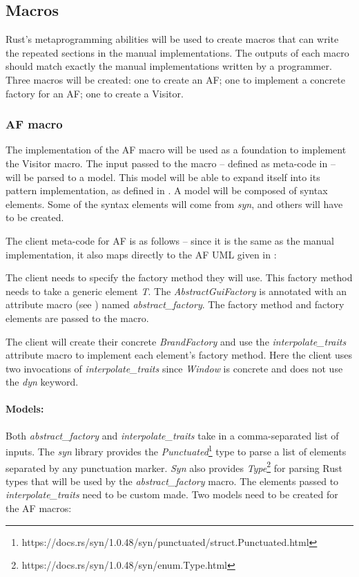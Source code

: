
\subsection{Macros}
Rust's metaprogramming abilities will be used to create macros that can write the repeated sections in the manual implementations.
The outputs of each macro should match exactly the manual implementations written by a programmer.
Three macros will be created: one to create an AF; one to implement a concrete factory for an AF; one to create a Visitor.

\subsubsection{AF macro}
The implementation of the AF macro will be used as a foundation to implement the Visitor macro.
The input passed to the macro -- defined as meta-code in  -- will be parsed to a model.
This model will be able to expand itself into its pattern implementation, as defined in .
A model will be composed of syntax elements.
Some of the syntax elements will come from \textit{syn}, and others will have to be created.

The client meta-code for AF is as follows -- since it is the same as the manual implementation, it also maps directly to the AF UML given in :


The client needs to specify the factory method they will use.
This factory method needs to take a generic element \textit{T}.
The \textit{AbstractGuiFactory} is annotated with an attribute macro (see ) named \textit{abstract\_factory}.
The factory method and factory elements are passed to the macro.

The client will create their concrete \textit{BrandFactory} and use the \textit{interpolate\_traits} attribute macro to implement each element's factory method.
Here the client uses two invocations of \textit{interpolate\_traits} since \textit{Window} is concrete and does not use the \textit{dyn} keyword.

\paragraph{Models:}
Both \textit{abstract\_factory} and \textit{interpolate\_traits} take in a comma-separated list of inputs.
The \textit{syn} library provides the \textit{Punctuated}\footnote{https://docs.rs/syn/1.0.48/syn/punctuated/struct.Punctuated.html} type to parse a list of elements separated by any punctuation marker.
\textit{Syn} also provides \textit{Type}\footnote{https://docs.rs/syn/1.0.48/syn/enum.Type.html} for parsing Rust types that will be used by the \textit{abstract\_factory} macro.
The elements passed to \textit{interpolate\_traits} need to be custom made.
Two models need to be created for the AF macros:

